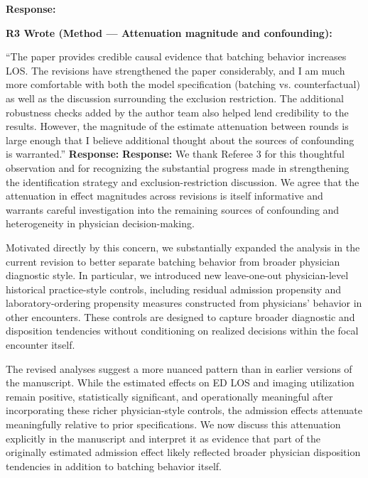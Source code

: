 \documentclass[11pt]{article}
\newenvironment{quote2}
{ \bigskip
\noindent
         \small\em
         \baselineskip=14pt
}
\newcommand{\1}{\hbox{\rm 1\kern-.35em 1}}
\begin{document}
\noindent\textbf{Response:} \color{blue}
\color{black}

\begin{quote2}
\textbf{R3 Wrote (Method --- Attenuation magnitude and confounding):}

\noindent ``The paper provides credible causal evidence that batching behavior increases LOS. The revisions have strengthened the paper considerably, and I am much more comfortable with both the model specification (batching vs. counterfactual) as well as the discussion surrounding the exclusion restriction. The additional robustness checks added by the author team also helped lend credibility to the results. However, the magnitude of the estimate attenuation between rounds is large enough that I believe additional thought about the sources of confounding is warranted.''
\end{quote2}

\noindent\textbf{Response:} \color{blue}\noindent\textbf{Response:} We thank Referee 3 for this thoughtful observation and for recognizing the substantial progress made in strengthening the identification strategy and exclusion-restriction discussion. We agree that the attenuation in effect magnitudes across revisions is itself informative and warrants careful investigation into the remaining sources of confounding and heterogeneity in physician decision-making.

Motivated directly by this concern, we substantially expanded the analysis in the current revision to better separate batching behavior from broader physician diagnostic style. In particular, we introduced new leave-one-out physician-level historical practice-style controls, including residual admission propensity and laboratory-ordering propensity measures constructed from physicians’ behavior in other encounters. These controls are designed to capture broader diagnostic and disposition tendencies without conditioning on realized decisions within the focal encounter itself.

The revised analyses suggest a more nuanced pattern than in earlier versions of the manuscript. While the estimated effects on ED LOS and imaging utilization remain positive, statistically significant, and operationally meaningful after incorporating these richer physician-style controls, the admission effects attenuate meaningfully relative to prior specifications. We now discuss this attenuation explicitly in the manuscript and interpret it as evidence that part of the originally estimated admission effect likely reflected broader physician disposition tendencies in addition to batching behavior itself.
\end{document}

